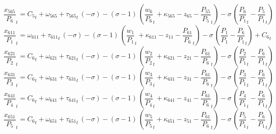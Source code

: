 \begin{dmath}
{{\frac{x_{565}}{P_{6}}}}_{t}={{C_{5}}}_{t}+{{\omega_{565}}}+{{\tau_{565}}}_{t}\, \left(-{{\sigma}}\right)-\left({{\sigma}}-1\right)\, \left({{\frac{w_{6}}{P_{6}}}}_{t}+{{\kappa_{565}}}-{{z_{65}}}-{{\frac{P_{55}}{P_{5}}}}_{t}\right)-{{\sigma}}\, \left({{\frac{P_{6}}{P_{1}}}}_{t}-{{\frac{P_{5}}{P_{1}}}}_{t}\right)
\end{dmath}
\begin{dmath}
{{\frac{x_{611}}{P_{1}}}}_{t}={{\omega_{611}}}+{{\tau_{611}}}_{t}\, \left(-{{\sigma}}\right)-\left({{\sigma}}-1\right)\, \left({{\frac{w_{1}}{P_{1}}}}_{t}+{{\kappa_{611}}}-{{z_{11}}}-{{\frac{P_{61}}{P_{6}}}}_{t}\right)-{{\sigma}}\, \left({{\frac{P_{1}}{P_{1}}}}-{{\frac{P_{6}}{P_{1}}}}_{t}\right)+{{C_{6}}}_{t}
\end{dmath}
\begin{dmath}
{{\frac{x_{621}}{P_{2}}}}_{t}={{C_{6}}}_{t}+{{\omega_{621}}}+{{\tau_{621}}}_{t}\, \left(-{{\sigma}}\right)-\left({{\sigma}}-1\right)\, \left({{\frac{w_{2}}{P_{2}}}}_{t}+{{\kappa_{621}}}-{{z_{21}}}-{{\frac{P_{61}}{P_{6}}}}_{t}\right)-{{\sigma}}\, \left({{\frac{P_{2}}{P_{1}}}}_{t}-{{\frac{P_{6}}{P_{1}}}}_{t}\right)
\end{dmath}
\begin{dmath}
{{\frac{x_{631}}{P_{3}}}}_{t}={{C_{6}}}_{t}+{{\omega_{631}}}+{{\tau_{631}}}_{t}\, \left(-{{\sigma}}\right)-\left({{\sigma}}-1\right)\, \left({{\frac{w_{3}}{P_{3}}}}_{t}+{{\kappa_{631}}}-{{z_{31}}}-{{\frac{P_{61}}{P_{6}}}}_{t}\right)-{{\sigma}}\, \left({{\frac{P_{3}}{P_{1}}}}_{t}-{{\frac{P_{6}}{P_{1}}}}_{t}\right)
\end{dmath}
\begin{dmath}
{{\frac{x_{641}}{P_{4}}}}_{t}={{C_{6}}}_{t}+{{\omega_{641}}}+{{\tau_{641}}}_{t}\, \left(-{{\sigma}}\right)-\left({{\sigma}}-1\right)\, \left({{\frac{w_{4}}{P_{4}}}}_{t}+{{\kappa_{641}}}-{{z_{41}}}-{{\frac{P_{61}}{P_{6}}}}_{t}\right)-{{\sigma}}\, \left({{\frac{P_{4}}{P_{1}}}}_{t}-{{\frac{P_{6}}{P_{1}}}}_{t}\right)
\end{dmath}
\begin{dmath}
{{\frac{x_{651}}{P_{5}}}}_{t}={{C_{6}}}_{t}+{{\omega_{651}}}+{{\tau_{651}}}_{t}\, \left(-{{\sigma}}\right)-\left({{\sigma}}-1\right)\, \left({{\frac{w_{5}}{P_{5}}}}_{t}+{{\kappa_{651}}}-{{z_{51}}}-{{\frac{P_{61}}{P_{6}}}}_{t}\right)-{{\sigma}}\, \left({{\frac{P_{5}}{P_{1}}}}_{t}-{{\frac{P_{6}}{P_{1}}}}_{t}\right)
\end{dmath}
